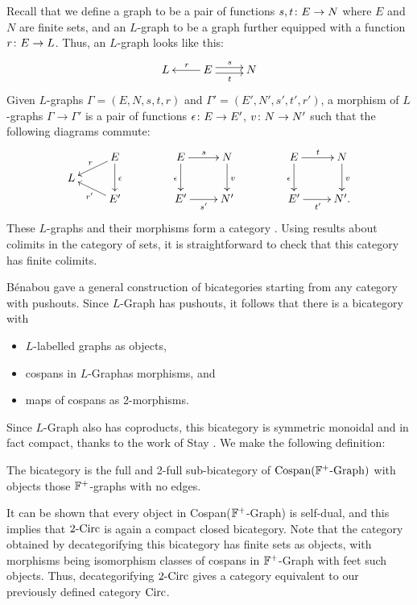 Recall that we define a graph to be a pair of functions $s,t {\colon} E \to
N$ where $E$ and $N$ are finite sets, and an $L$-graph to be a graph further
equipped with a function $r{\colon} E \to L$.  Thus, an $L$-graph looks like this:
\[
\xymatrix{
L & E \ar@<2.5pt>[r]^{s} \ar@<-2.5pt>[r]_{t} \ar[l]_{r} & N
}
\]
Given $L$-graphs $\Gamma = (E,N,s,t,r)$ and $\Gamma' = (E',N',s',t',r')$, a
morphism of $L$-graphs $\Gamma \to \Gamma'$ is a pair of functions $\epsilon{\colon} E \to
E'$, $v{\colon} N \to N'$ such that the following diagrams commute:
\[
\xymatrix @R=5.7pt{
& E \ar[dl]_{r} \ar[dd]^{\eps} \\
L \\
& E' \ar[ul]^{r'}
}
\qquad\qquad
\xymatrix{
E \ar[r]^{s} \ar[d]_{\eps} & N \ar[d]^{v}  \\
E' \ar[r]_{s'} & N'
}
\qquad\qquad
\xymatrix{
E \ar[r]^{t} \ar[d]_{\eps} & N \ar[d]^{v}  \\
E' \ar[r]_{t'} & N'.
}
\]
These $L$-graphs and their morphisms form a category . Using
results about colimits in the category of sets, it is straightforward to check
that this category has finite colimits.

B\'enabou \cite{Be} gave a general construction of bicategories starting from any
category with pushouts.  Since $L$-Graph has pushouts, it follows that 
there is a bicategory  with
\begin{itemize}
\item $L$-labelled graphs as objects,
\item cospans in $L$-Graphas morphisms, and 
\item maps of cospans as 2-morphisms.
\end{itemize}
Since $L$-Graph also has coproducts, this bicategory is symmetric monoidal and 
in fact compact, thanks to the work of Stay \cite{St}.   We make the following definition:

\begin{definition}
The bicategory  is the full and 2-full sub-bicategory of
$\mathrm{Cospan(}{\mathbb F}^+\mbox{-}\mathrm{Graph})$ with objects those ${\mathbb F}^+$-graphs with no edges.
\end{definition}

It can be shown that every object in Cospan(${\mathbb F}^+$-Graph) is self-dual, and this
implies that $2\mbox{-}\mathrm{Circ}$ is again a compact closed bicategory.
Note that the category obtained by decategorifying this bicategory has
finite sets as objects, with morphisms being isomorphism classes of cospans in 
${\mathbb F}^+$-Graph with feet such objects.   Thus, decategorifying $2\mbox{-}\mathrm{Circ}$
gives a category equivalent to our previously defined category $\mathrm{Circ}$.

